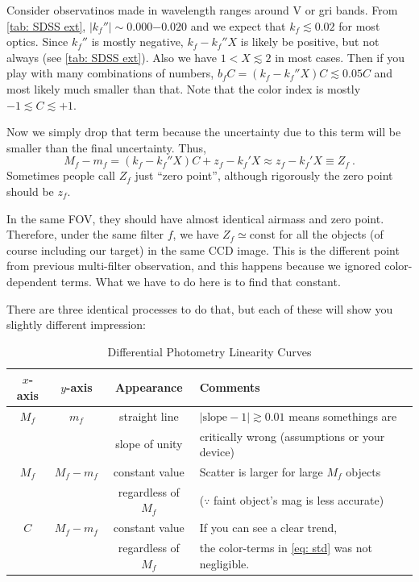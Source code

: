 \begin{ex}
  Consider observatinos made in wavelength ranges around V or gri bands. From \cref{tab: SDSS ext}, $ |k_f''| \sim 0.000 \mathrm{-} 0.020 $ and we expect that $ k_f \lesssim 0.02 $ for most optics. Since $ k_f'' $ is mostly negative, $ k_f - k_f'' X $ is likely be positive, but not always (see \cref{tab: SDSS ext}). Also we have $ 1 < X \lesssim 2 $ in most cases. Then if you play with many combinations of numbers, $ b_f C = (k_f - k_f'' X) C \lesssim 0.05 C $ and most likely much smaller than that. Note that the color index is mostly $ -1 \lesssim C \lesssim +1 $.
\end{ex}

Now we simply drop that term because the uncertainty due to this term will be smaller than the final uncertainty. Thus,
\begin{equation} \label{eq: 1-filter diff phot}
  M_f - m_f = (k_f - k_f'' X) C + z_f - k_f' X \approx z_f - k_f' X \equiv Z_f ~.
\end{equation}
Sometimes people call $ Z_f $ just ``zero point'', although rigorously the zero point should be $ z_f $. 

In the same FOV, they should have almost identical airmass and zero point. Therefore, under the same filter $ f $, we have $ Z_f \simeq \mathrm{const} $ for all the objects (of course including our target) in the same CCD image. This is the different point from previous multi-filter observation, and this happens because we ignored color-dependent terms. What we have to do here is to find that constant.

There are three identical processes to do that, but each of these will show you slightly different impression:
\begin{table}[ht!]
\caption{Differential Photometry Linearity Curves}
\label{tab: 1-filter diff phot}
\centering
  \begin{tabular}{cc|c|l}
   $ x $-axis & $ y $-axis & Appearance & Comments \\
  \hline
  $ M_f $ & $ m_f $       & straight line & 
  $ |\mathrm{slope} - 1| \gtrsim 0.01 $ means somethings are \\
  && slope of unity & critically wrong (assumptions or your device)\\
  \hline
  $ M_f $ & $ M_f - m_f $ & constant value & 
  Scatter is larger for large $ M_f $ objects \\
  && regardless of $ M_f $ & ($ \because $ faint object's mag is less accurate) \\
  \hline
  $ C $  & $ M_f - m_f $ & constant value & 
  If you can see a clear trend, \\
  && regardless of $ M_f $ & the color-terms in \cref{eq: std} was not negligible.\\
\end{tabular}
\end{table}


